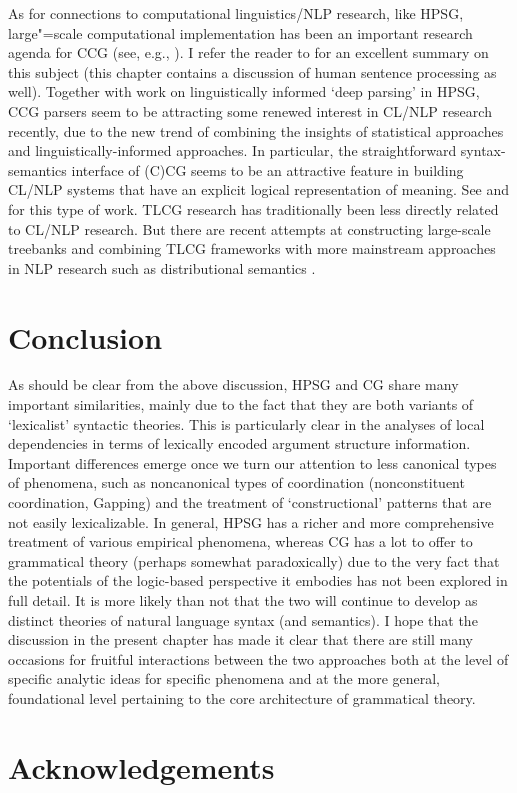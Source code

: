\documentclass[output=paper]{langsci/langscibook}
\begin{document}
As for connections to computational linguistics/NLP research, like
HPSG, large"=scale computational implementation has been an important
research agenda for CCG (see, e.g., \citet{CC2007a-u}). I refer
the reader to \cite[Chapter 13]{steedman2012} for an excellent
summary on this subject (this chapter contains a discussion of human
sentence processing as well). Together with work on linguistically
informed `deep parsing' in HPSG, CCG parsers seem to be attracting
some renewed interest in CL/NLP research recently, due to the new trend of
combining the insights of statistical approaches and
linguistically-informed approaches. In particular, the straightforward
syntax-semantics interface of (C)CG seems to be an attractive feature
in building CL/NLP systems that have an explicit logical
representation of meaning. See \citet{steedmanlewis13} and \citet{mineshima-etal:2016:emnlp}
for this type of work. TLCG research has traditionally been less
directly related to CL/NLP research. But there are recent attempts at
constructing large-scale treebanks \citep{moot2015} and combining TLCG
frameworks with more mainstream approaches in NLP research such as
distributional semantics \citep{moot2018}.


\section{Conclusion}

As should be clear from the above discussion, HPSG and CG share many
important similarities, mainly due to the fact that they are both
variants of `lexicalist' syntactic theories. This is particularly
clear in the analyses of local dependencies in terms of lexically
encoded argument structure information. Important differences emerge
once we turn our attention to less canonical types of phenomena, such
as noncanonical types of coordination (nonconstituent coordination,
Gapping) and the treatment of `constructional' patterns that are not
easily lexicalizable. In general, HPSG has a richer and more
comprehensive treatment of various empirical phenomena, whereas CG has
a lot to offer to grammatical theory (perhaps somewhat paradoxically)
due to the very fact that the potentials of the logic-based
perspective it embodies has not been explored in full
detail. It is more likely than not that the two will
continue to develop as distinct theories of natural language syntax
(and semantics). I hope that the discussion
in the present chapter has made it clear that there
are still many occasions for fruitful interactions between the two
approaches both at the level of specific analytic ideas for specific phenomena
and at the more general, foundational level pertaining to the
core architecture of grammatical theory.

 
\section*{Acknowledgements}



\printbibliography[heading=subbibliography,notkeyword=this] 
\end{document}
